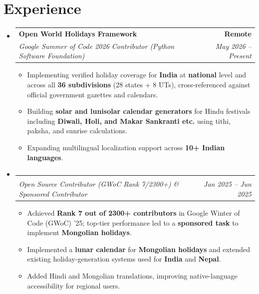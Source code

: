 \documentclass[letterpaper,11pt]{article}
\makeatletter
\newcommand{\resumeItem}[1]{
  \item\small{
    {#1 \vspace{-3pt}}
  }
}
\newcommand{\resumeSubheading}[4]{
  \vspace{-2pt}\item
    \begin{tabular*}{1.0\textwidth}[t]{l@{\extracolsep{\fill}}r}
      \vspace{-2pt}\textbf{#1} & \textbf{\small #2} \\
      \textit{\small#3} & \textit{\small #4} \\
    \end{tabular*}\vspace{-8pt}
} %
\newcommand{\resumeSubHeadingListStart}{\begin{itemize}[leftmargin=0.0in, label={}]}
\newcommand{\resumeSubHeadingListEnd}{\end{itemize}}
\newcommand{\resumeItemListStart}{\begin{itemize}}
\newcommand{\resumeItemListEnd}{\end{itemize}\vspace{-9pt}}
\makeatother
\begin{document}
\section{Experience}
\resumeSubHeadingListStart
    \resumeSubheading
    {Open World Holidays Framework}{Remote}
    {Google Summer of Code 2026 Contributor (Python Software Foundation)}{May 2026 -- Present}
    \resumeItemListStart
        \resumeItem{Implementing verified holiday coverage for \textbf{India} at \textbf{national} level and across all \textbf{36 subdivisions} (28 states + 8 UTs), cross-referenced against official government gazettes and calendars.}
        \resumeItem{Building \textbf{solar and lunisolar calendar generators} for Hindu festivals including \textbf{Diwali, Holi, and Makar Sankranti etc.} using tithi, paksha, and sunrise calculations.}
        \resumeItem{Expanding multilingual localization support across \textbf{10+ Indian languages}.}
    \resumeItemListEnd
\vspace{-8pt}

    \resumeSubheading
    {}{}
    {Open Source Contributor (GWoC Rank 7/2300+) \& Sponsored Contributor}{Jan 2025 -- Jun 2025}
    \resumeItemListStart
        \resumeItem{Achieved \textbf{Rank 7 out of 2300+ contributors} in Google Winter of Code (GWoC) '25; top-tier performance led to a \textbf{sponsored task} to implement \textbf{Mongolian holidays}.}
        \resumeItem{Implemented a \textbf{lunar calendar} for \textbf{Mongolian holidays} and extended existing holiday-generation systems used for \textbf{India} and \textbf{Nepal}.}
        \resumeItem{Added Hindi and Mongolian translations, improving native-language accessibility for regional users.}
    \resumeItemListEnd
\resumeSubHeadingListEnd
\vspace{-13pt}


\end{document}
